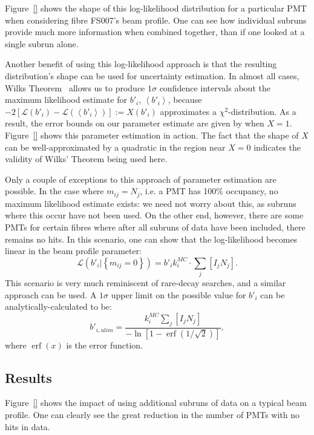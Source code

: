 Figure~\ref{} shows the shape of this log-likelihood distribution for a particular PMT when considering fibre FS007's beam profile. One can see how individual subruns provide much more information when combined together, than if one looked at a single subrun alone.

Another benefit of using this log-likelihood approach is that the resulting distribution's shape can be used for uncertainty estimation. In almost all cases, Wilks Theorem~\cite{} allows us to produce $1 \sigma$ confidence intervals about the maximum likelihood estimate for $b'_{i}$, $\left<b'_{i}\right>$, because $-2\left[\mathcal{L}\left(b'_{i}\right) - \mathcal{L}\left(\left<b'_{i}\right>\right)\right] := X(b'_{i})$ approximates a $\chi^2$-distribution. As a result, the error bounds on our parameter estimate are given by when $X = 1$. Figure~\ref{} shows this parameter estimation in action. The fact that the shape of $X$ can be well-approximated by a quadratic in the region near $X = 0$ indicates the validity of Wilks' Theorem being used here.

Only a couple of exceptions to this approach of parameter estimation are possible. In the case where $m_{ij} = N_{j}$, i.e. a PMT has 100\% occupancy, no maximum likelihood estimate exists: we need not worry about this, as subruns where this occur have not been used. On the other end, however, there are some PMTs for certain fibres where after all subruns of data have been included, there remains no hits. In this scenario, one can show that the log-likelihood becomes linear in the beam profile parameter:
\begin{equation}
    \mathcal{L}\left(b'_{i}|\left\{m_{ij}=0\right\}\right) = b'_{i}k_{i}^{MC}\cdot\sum_{j}\left[I_{j}N_{j}\right].
\end{equation}
This scenario is very much reminiscent of rare-decay searches, and a similar approach can be used. A $1 \sigma$ upper limit on the possible value for $b'_{i}$ can be analytically-calculated to be:
\begin{equation}
    b'_{i,ulim} = \frac{k_{i}^{MC}\sum_{j}\left[I_{j}N_{j}\right]}{-\ln\left[1 - \operatorname{erf}\left(1/\sqrt{2}\right)\right]},
\end{equation}
where $\operatorname{erf}(x)$ is the error function.

\subsection{Results}\label{sect:results}
Figure~\ref{} shows the impact of using additional subruns of data on a typical beam profile. One can clearly see the great reduction in the number of PMTs with no hits in data.